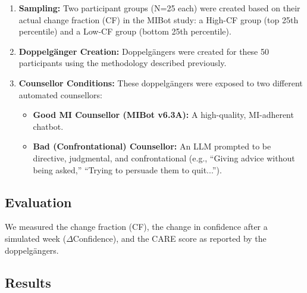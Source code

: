 \begin{enumerate}
	\item \textbf{Sampling:} Two participant groups (N=25 each) were created based on their actual change fraction (CF) in the MIBot study: a High-CF group (top 25th percentile) and a Low-CF group (bottom 25th percentile).

	\item \textbf{Doppelgänger Creation:} Doppelgängers were created for these 50 participants using the methodology described previously.

	\item \textbf{Counsellor Conditions:} These doppelgängers were exposed to two different automated counsellors:
	      \begin{itemize}
		      \item \textbf{Good MI Counsellor (MIBot v6.3A):} A high-quality, MI-adherent chatbot.

		      \item \textbf{Bad (Confrontational) Counsellor:} An LLM prompted to be directive, judgmental, and confrontational (e.g., ``Giving advice without being asked,'' ``Trying to persuade them to quit...'').
	      \end{itemize}
\end{enumerate}

\subsection{Evaluation}
We measured the change fraction (CF), the change in confidence after a simulated week
($\Delta$Confidence), and the CARE score as reported by the doppelgängers.

\subsection{Results}

